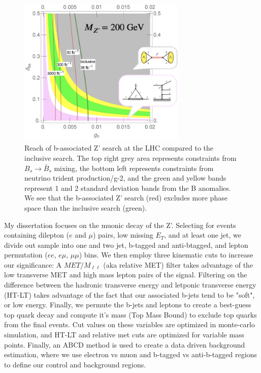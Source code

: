 \documentclass[11pt]{article}
\begin{document}
    \label{fig:ABCD_eqn}


\begin{figure}
    \centering
    \includegraphics[width=8cm]{images/excluded_phase_space.png}
    \caption{Reach of b-associated Z' search at the LHC compared to the inclusive search. The top right grey area represents constraints from $B_s\rightarrow \bar{B}_s$ mixing, the bottom left represents constraints from neutrino trident production/g-2, and the green and yellow bands represent 1 and 2 standard deviation bands from the B anomalies. We see that the b-associated Z' search (red) excludes more phase space than the inclusive search (green).}
    \label{fig:exc_pahse_space}
\end{figure}


My dissertation focuses on the muonic decay of the Z'. Selecting for events containing dilepton ($e$ and $\mu$) pairs, low missing $E_T$, and at least one jet, we divide out sample into one and two jet, b-tagged and anti-btagged, and lepton permutation ($ee$, $e\mu$, $\mu\mu$) bins. We then employ three kinematic cuts to increase our significance: A $MET/M_{\ell\ell}$ (aka relative MET) filter takes advantage of the low transverse MET and high mass lepton pairs of the signal. Filtering on the difference between the hadronic transverse energy and letponic transverse energy (HT-LT) takes advantage of the fact that our associated b-jets tend to be "soft", or low energy. Finally, we permute the b-jets and leptons to create a best-guess top quark decay and compute it's mass (Top Mass Bound) to exclude top quarks from the final events. Cut values on these variables are optimized in monte-carlo simulation, and HT-LT and relative met cuts are optimized for variable mass points. Finally, an ABCD method is used to create a data driven background estimation, where we use electron vs muon and b-tagged vs anti-b-tagged regions to define our control and background regions. 
\end{document}
